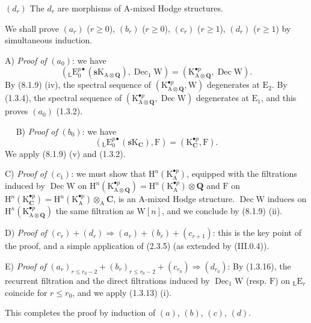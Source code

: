 \documentclass[11pt,leqno]{article}
\newcommand{\Page}[1]{\ifvmode\noindent\else\unskip\ \fi{\footnotesize\textcolor{gray}{[p.\,#1]}}\ \ignorespaces}
\begin{document}
\((d_{r})\) The \(d_{r}\) are morphisms of \(\mathrm{A}\)-mixed Hodge structures.

We shall prove \((a_{r})\) (\(r\geq0\)), \((b_{r})\) (\(r\geq0\)), \((c_{r})\) (\(r\geq1\)), \((d_{r})\) (\(r\geq1\)) by simultaneous induction.

A) \textit{Proof of} \((a_{0})\): we have
\[
({}_{\mathrm{L}}\mathrm{E}_{0}^{p\bullet}
(\mathbf{s}\mathrm{K}_{\mathrm{A}\otimes\mathbf{Q}}),
\operatorname{Dec}_{1}\mathrm{W})
=
(\mathrm{K}_{\mathrm{A}\otimes\mathbf{Q}}^{\bullet p},
\operatorname{Dec}\mathrm{W}).
\]
By (8.1.9) (iv), the spectral sequence of \((\mathrm{K}_{\mathrm{A}\otimes\mathbf{Q}}^{\bullet p},\mathrm{W})\) degenerates at \(\mathrm{E}_{2}\). By (1.3.4), the spectral sequence of \((\mathrm{K}_{\mathrm{A}\otimes\mathbf{Q}}^{\bullet p},\operatorname{Dec}\mathrm{W})\) degenerates at \(\mathrm{E}_{1}\), and this proves \((a_{0})\) (1.3.2).

\Page{34}
B) \textit{Proof of} \((b_{0})\): we have
\[
({}_{\mathrm{L}}\mathrm{E}_{0}^{p\bullet}
(\mathbf{s}\mathrm{K}_{\mathbf{C}}),\mathrm{F})
=
(\mathrm{K}_{\mathbf{C}}^{\bullet p},\mathrm{F}).
\]
We apply (8.1.9) (v) and (1.3.2).

C) \textit{Proof of} \((c_{1})\): we must show that \(\mathrm{H}^{n}(\mathrm{K}_{\mathrm{A}}^{\bullet p})\), equipped with the filtrations induced by \(\operatorname{Dec}\mathrm{W}\) on \(\mathrm{H}^{n}(\mathrm{K}_{\mathrm{A}\otimes\mathbf{Q}}^{\bullet p})=\mathrm{H}^{n}(\mathrm{K}_{\mathrm{A}}^{\bullet p})\otimes\mathbf{Q}\) and \(\mathrm{F}\) on \(\mathrm{H}^{n}(\mathrm{K}_{\mathbf{C}}^{\bullet p})=\mathrm{H}^{n}(\mathrm{K}_{\mathrm{A}}^{\bullet p})\otimes_{\mathrm{A}}\mathbf{C}\), is an \(\mathrm{A}\)-mixed Hodge structure. \(\operatorname{Dec}\mathrm{W}\) induces on \(\mathrm{H}^{n}(\mathrm{K}_{\mathrm{A}\otimes\mathbf{Q}}^{\bullet p})\) the same filtration as \(\mathrm{W}[n]\), and we conclude by (8.1.9) (ii).

D) \textit{Proof of} \((c_{r})+(d_{r})\Rightarrow(a_{r})+(b_{r})+(c_{r+1})\): this is the key point of the proof, and a simple application of (2.3.5) (as extended by (III.0.4)).

E) \textit{Proof of} \((a_{r})_{r\leq r_{0}-2}+(b_{r})_{r\leq r_{0}-2}+(c_{r_{0}})\Rightarrow(d_{r_{0}})\): By (1.3.16), the recurrent filtration and the direct filtrations induced by \(\operatorname{Dec}_{1}\mathrm{W}\) (resp. \(\mathrm{F}\)) on \({}_{\mathrm{L}}\mathrm{E}_{r}\) coincide for \(r\leq r_{0}\), and we apply (1.3.13) (i).

This completes the proof by induction of \((a)\), \((b)\), \((c)\), \((d)\).
\end{document}

